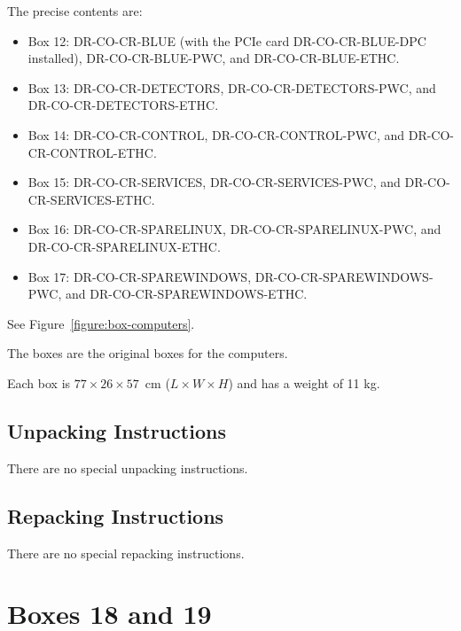 \documentclass{article}
\begin{document}
The precise contents are:

\begin{itemize}
    \item Box 12: DR-CO-CR-BLUE (with the PCIe card DR-CO-CR-BLUE-DPC installed), DR-CO-CR-BLUE-PWC, and DR-CO-CR-BLUE-ETHC.
    \item Box 13: DR-CO-CR-DETECTORS, DR-CO-CR-DETECTORS-PWC, and DR-CO-CR-DETECTORS-ETHC.
    \item Box 14: DR-CO-CR-CONTROL, DR-CO-CR-CONTROL-PWC, and DR-CO-CR-CONTROL-ETHC.
    \item Box 15: DR-CO-CR-SERVICES, DR-CO-CR-SERVICES-PWC, and DR-CO-CR-SERVICES-ETHC.
    \item Box 16: DR-CO-CR-SPARELINUX, DR-CO-CR-SPARELINUX-PWC, and DR-CO-CR-SPARELINUX-ETHC.
    \item Box 17: DR-CO-CR-SPAREWINDOWS, DR-CO-CR-SPAREWINDOWS-PWC, and DR-CO-CR-SPAREWINDOWS-ETHC.
\end{itemize}

See Figure~\ref{figure:box-computers}.

The boxes are the original boxes for the computers.

Each box is $77 \times 26 \times 57$~cm ($L \times W \times H$) and has a weight of 11 kg.

\subsection{Unpacking Instructions}

There are no special unpacking instructions.

\subsection{Repacking Instructions}

There are no special repacking instructions.


\clearpage
\section{Boxes 18 and 19}
\end{document}
